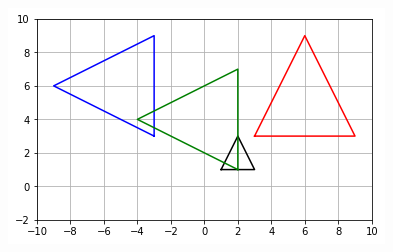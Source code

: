\documentclass[xcolor=dvipsnames,aspectratio=169,t]{beamer}
\begin{document}
\begin{frame}
\begin{columns}[T]
\includegraphics[width=0.9\tw]{images/fig-triangle-combo2.png}

\end{columns}

\end{frame}
\end{document}
